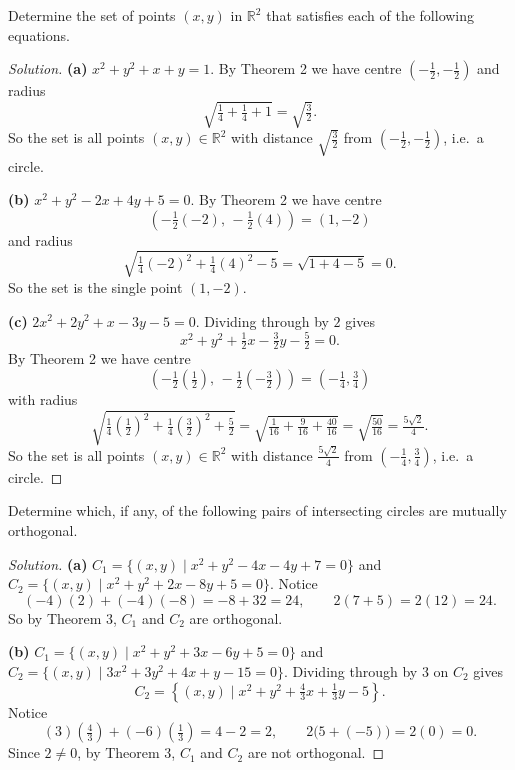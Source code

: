 \begin{tcolorbox}[title=Problem 4, breakable]
    Determine the set of points $(x,y)$ in $\mathbb{R}^2$ that satisfies each of the following equations.
\end{tcolorbox}
\begin{proof}[Solution]
    \textbf{(a)} $x^2 + y^2 + x + y = 1$.
    By Theorem 2 we have centre $\left(-\tfrac{1}{2}, -\tfrac{1}{2}\right)$ and radius
    \[\sqrt{\tfrac{1}{4} + \tfrac{1}{4} + 1} = \sqrt{\tfrac{3}{2}}.\]
    So the set is all points $(x,y) \in \mathbb{R}^2$ with distance $\sqrt{\tfrac{3}{2}}$ from $\left(-\tfrac{1}{2}, -\tfrac{1}{2}\right)$, i.e.\ a circle.

    \textbf{(b)} $x^2 + y^2 - 2x + 4y + 5 = 0$.
    By Theorem 2 we have centre
    \[\left(-\tfrac{1}{2}(-2),\, -\tfrac{1}{2}(4)\right) = (1, -2)\]
    and radius
    \[\sqrt{\tfrac{1}{4}(-2)^2 + \tfrac{1}{4}(4)^2 - 5} = \sqrt{1 + 4 - 5} = 0.\]
    So the set is the single point $(1, -2)$.

    \textbf{(c)} $2x^2 + 2y^2 + x - 3y - 5 = 0$. Dividing through by $2$ gives
    \[x^2 + y^2 + \tfrac{1}{2}x - \tfrac{3}{2}y - \tfrac{5}{2} = 0.\]
    By Theorem 2 we have centre
    \[\left(-\tfrac{1}{2}\left(\tfrac{1}{2}\right),\, -\tfrac{1}{2}\left(-\tfrac{3}{2}\right)\right) = \left(-\tfrac{1}{4}, \tfrac{3}{4}\right)\]
    with radius
    \[\sqrt{\tfrac{1}{4}\left(\tfrac{1}{2}\right)^2 + \tfrac{1}{4}\left(\tfrac{3}{2}\right)^2 + \tfrac{5}{2}}
    = \sqrt{\tfrac{1}{16} + \tfrac{9}{16} + \tfrac{40}{16}} = \sqrt{\tfrac{50}{16}} = \tfrac{5\sqrt{2}}{4}.\]
    So the set is all points $(x,y) \in \mathbb{R}^2$ with distance $\tfrac{5\sqrt{2}}{4}$ from $\left(-\tfrac{1}{4}, \tfrac{3}{4}\right)$, i.e.\ a circle.
\end{proof}

\begin{tcolorbox}[title=Problem 5, breakable]
    Determine which, if any, of the following pairs of intersecting circles are mutually orthogonal.
\end{tcolorbox}
\begin{proof}[Solution]
    \textbf{(a)} $C_1 = \{(x,y) \mid x^2 + y^2 - 4x - 4y + 7 = 0\}$ and
    $C_2 = \{(x,y) \mid x^2 + y^2 + 2x - 8y + 5 = 0\}$.
    Notice
    \[(-4)(2) + (-4)(-8) = -8 + 32 = 24, \qquad 2(7 + 5) = 2(12) = 24.\]
    So by Theorem 3, $C_1$ and $C_2$ are orthogonal.

    \textbf{(b)} $C_1 = \{(x,y) \mid x^2 + y^2 + 3x - 6y + 5 = 0\}$ and
    $C_2 = \{(x,y) \mid 3x^2 + 3y^2 + 4x + y - 15 = 0\}$.
    Dividing through by $3$ on $C_2$ gives
    \[C_2 = \left\{(x,y) \mid x^2 + y^2 + \tfrac{4}{3}x + \tfrac{1}{3}y - 5\right\}.\]
    Notice
    \[(3)\!\left(\tfrac{4}{3}\right) + (-6)\!\left(\tfrac{1}{3}\right) = 4 - 2 = 2,
    \qquad 2\bigl(5 + (-5)\bigr) = 2(0) = 0.\]
    Since $2 \neq 0$, by Theorem 3, $C_1$ and $C_2$ are not orthogonal.
\end{proof}

